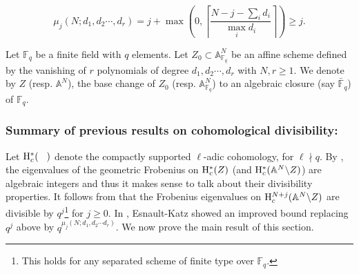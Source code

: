 \documentclass[12pt, reqno]{amsart}
\theoremstyle{plain}
\theoremstyle{definition}
\theoremstyle{definition}
\newcommand{\bbA}{{\mathbb A}}
\newcommand{\bbF}{{\mathbb F}}
\newcommand{\rH}{{\rm H}}
\begin{document}
\begin{equation}\label{BCH_1}
\mu_{j}(N;d_1,d_2 \cdots,d_r)=j+\max(0,\left\lceil\frac{N-j-\sum_id_i}{\max_i d_i}\right\rceil)\geq j.
\end{equation}

Let $\bbF_{q}$ be a finite field with $q$ elements. Let $Z_0 \subset \bbA^N_{\bbF_{q}}$ be an affine scheme defined by the vanishing of $r$ polynomials of degree $d_1,d_2 \cdots, d_r$ with $N,r \geq 1$. We denote by $Z$ (resp. $\bbA^N$), the base change of $Z_0$ (resp. $\bbA^N_{\bbF_q}$) to an algebraic closure (say $\bar{\bbF}_q$) of $\bbF_q$. 

\subsubsection*{Summary of previous results on cohomological divisibility:}Let $\rH_c^*(\hspace{0.3cm})$ denote the compactly supported $\ell$-adic cohomology, for $\ell \nmid q$. By \cite[XXI, Appendice]{SGA7II}, the eigenvalues of the geometric Frobenius on $\rH_c^*(Z)$ (and $\rH^*_c(\bbA^N\backslash Z)$) are algebraic integers and thus it makes sense to talk about their divisibility properties. 
 It follows from \cite[XXI, Appendice, (5.2)]{SGA7II} that the Frobenius eigenvalues on $\rH_c^{N+j}(\bbA^N \backslash Z)$ are divisible by $q^j$\footnote{This holds for any separated scheme of finite type over $\bbF_q$.} for $j \geq 0$. In \cite[Theorem 2.3, (2)]{EK05}, Esnault-Katz showed an improved bound replacing $q^j$ above by $q^{\mu_j(N;d_1,d_2 \cdots d_r)}$. We now prove the main result of this section. 
\end{document}
